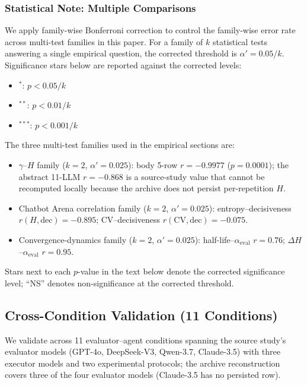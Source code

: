 \documentclass[11pt]{article}
\begin{document}
\subsubsection*{Statistical Note: Multiple Comparisons}

We apply family-wise Bonferroni correction to control the family-wise error rate across multi-test families in this paper. For a family of $k$ statistical tests answering a single empirical question, the corrected threshold is $\alpha' = 0.05/k$. Significance stars below are reported against the corrected levels:
\begin{itemize}[leftmargin=*,nosep]
 \item $^{*}$: $p < 0.05/k$
 \item $^{**}$: $p < 0.01/k$
 \item $^{***}$: $p < 0.001/k$
\end{itemize}
The three multi-test families used in the empirical sections are:
\begin{itemize}[leftmargin=*,nosep]
 \item $\gamma$--$H$ family ($k = 2$, $\alpha' = 0.025$): body 5-row $r = -0.9977$ ($p = 0.0001$); the abstract 11-LLM $r = -0.868$ is a source-study value that cannot be recomputed locally because the archive does not persist per-repetition $H$.
 \item Chatbot Arena correlation family ($k = 2$, $\alpha' = 0.025$): entropy--decisiveness $r(H, \text{dec}) = -0.895$; CV--decisiveness $r(\mathrm{CV}, \text{dec}) = -0.075$.
 \item Convergence-dynamics family ($k = 2$, $\alpha' = 0.025$): half-life--$\alpha_{\text{eval}}$ $r = 0.76$; $\Delta H$--$\alpha_{\text{eval}}$ $r = 0.95$.
\end{itemize}
Stars next to each $p$-value in the text below denote the corrected significance level; ``NS'' denotes non-significance at the corrected threshold.

\subsection{Cross-Condition Validation (11 Conditions)}

We validate across 11 evaluator--agent conditions spanning the source study's evaluator models (GPT-4o, DeepSeek-V3, Qwen-3.7, Claude-3.5) with three executor models and two experimental protocols; the archive reconstruction covers three of the four evaluator models (Claude-3.5 has no persisted row).
\end{document}
